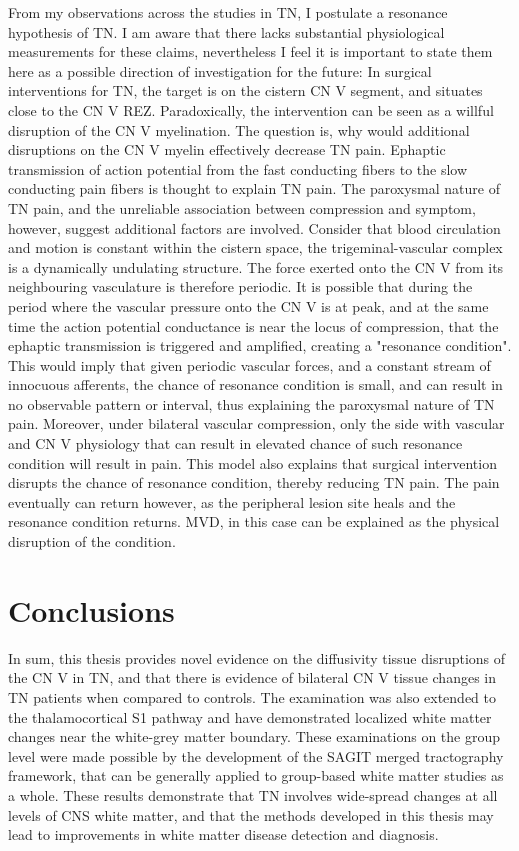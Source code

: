 From my observations across the studies in TN, I postulate a resonance hypothesis of TN. I am aware that there lacks substantial physiological measurements for these claims, nevertheless I feel it is important to state them here as a possible direction of investigation for the future: In surgical interventions for TN, the target is on the cistern CN V segment, and situates close to the CN V REZ. Paradoxically, the intervention can be seen as a willful disruption of the CN V myelination. The question is, why would additional disruptions on the CN V myelin effectively decrease TN pain. Ephaptic transmission of action potential from the fast conducting fibers to the slow conducting pain fibers is thought to explain TN pain. The paroxysmal nature of TN pain, and the unreliable association between compression and symptom, however, suggest additional factors are involved. Consider that blood circulation and motion is constant within the cistern space, the trigeminal-vascular complex is a dynamically undulating structure. The force exerted onto the CN V from its neighbouring vasculature is therefore periodic. It is possible that during the period where the vascular pressure onto the CN V is at peak, and at the same time the action potential conductance is near the locus of compression, that the ephaptic transmission is triggered and amplified, creating a "resonance condition". This would imply that given periodic vascular forces, and a constant stream of innocuous afferents, the chance of resonance condition is small, and can result in no observable pattern or interval, thus explaining the paroxysmal nature of TN pain. Moreover, under bilateral vascular compression, only the side with vascular and CN V physiology that can result in elevated chance of such resonance condition will result in pain. This model also explains that surgical intervention disrupts the chance of resonance condition, thereby reducing TN pain. The pain eventually can return however, as the peripheral lesion site heals and the resonance condition returns. MVD, in this case can be explained as the physical disruption of the condition.

\section{Conclusions}

In sum, this thesis provides novel evidence on the diffusivity tissue disruptions of the CN V in TN, and that there is evidence of bilateral CN V tissue changes in TN patients when compared to controls. The examination was also extended to the thalamocortical S1 pathway and have demonstrated localized white matter changes near the white-grey matter boundary. These examinations on the group level were made possible by the development of the SAGIT merged tractography framework, that can be generally applied to group-based white matter studies as a whole. These results demonstrate that TN involves wide-spread changes at all levels of CNS white matter, and that the methods developed in this thesis may lead to improvements in white matter disease detection and diagnosis.